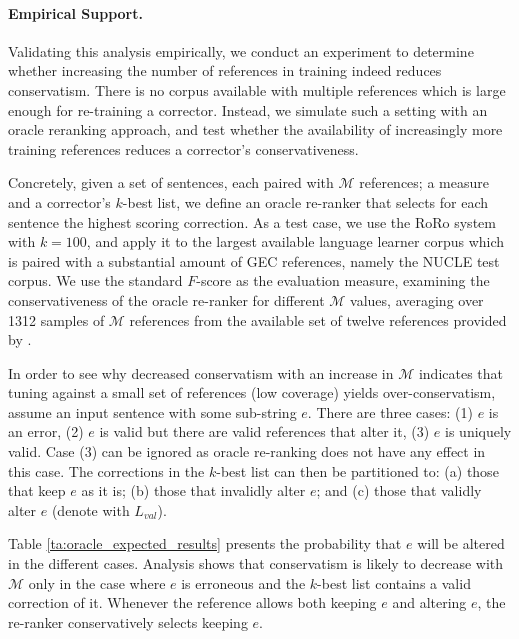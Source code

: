 \documentclass[letterpaper, 11pt]{article}
\begin{document}
\paragraph{Empirical Support.}
Validating this analysis empirically, we conduct an experiment to determine whether increasing
the number of references in training indeed reduces conservatism. There is no 
corpus available with multiple references which is large enough for re-training a corrector. 
Instead, we simulate such a setting with an oracle reranking approach, and test whether the 
availability of increasingly more training references reduces a corrector's conservativeness.

Concretely, given a set of sentences, each paired with $\mathcal{M}$ references; a measure and a 
corrector's $k$-best list, we define an oracle re-ranker that selects for each sentence the highest scoring correction.
As a test case, we use the RoRo system with $k=100$, and apply it to the 
largest available language learner corpus which is paired with a substantial amount of GEC references,
namely the NUCLE test corpus. We use the standard $F$-score as the evaluation measure,
examining the conservativeness of the oracle re-ranker for different $\mathcal{M}$ values, averaging over 1312 samples of 
$\mathcal{M}$ references from the available set of twelve references provided by \citet{bryant2015far}.

In order to see why decreased conservatism with an increase in $\mathcal{M}$ indicates
that tuning against a small set of references (low coverage) yields over-conservatism, 
assume an input sentence with some sub-string $e$. 
There are three cases: (1) $e$ is an error, (2) $e$ is valid but there are valid references that alter it, (3) $e$ is uniquely valid. Case (3) can be ignored as oracle re-ranking does not have any effect in this case.
The corrections in the $k$-best list can then be partitioned to: (a) those that keep $e$ as it is; 
(b) those that invalidly alter $e$; and (c) those that validly alter $e$ (denote with $L_{val}$). 

Table \ref{ta:oracle_expected_results} presents the probability that $e$ will be altered in the different cases.
Analysis shows that conservatism is likely to decrease with $\mathcal{M}$ only
  in the case where $e$ is erroneous and the $k$-best list contains a valid correction of it.
Whenever the reference allows both keeping $e$ and altering $e$, the re-ranker conservatively selects keeping $e$. 
\end{document}
